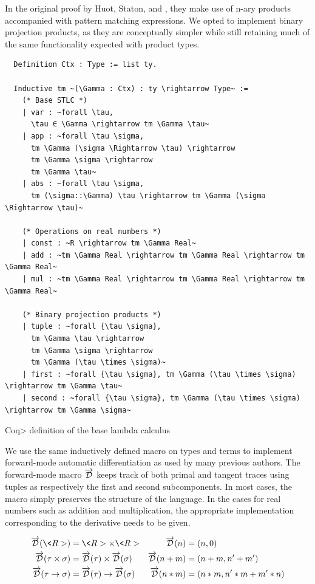\documentclass[11pt, final]{article}
\begin{document}
  In the original proof by Huot, Staton, and \Vakar{} \cite{huot2020correctness}, they make use of n-ary products accompanied with pattern matching expressions. We opted to implement binary projection products, as they are conceptually simpler while still retaining much of the same functionality expected with product types.

  \begin{listing}
    \begin{verbatim}
  Definition Ctx : Type := list ty.

  Inductive tm ~(\Gamma : Ctx) : ty \rightarrow Type~ :=
    (* Base STLC *)
    | var : ~forall \tau,
      \tau ∈ \Gamma \rightarrow tm \Gamma \tau~
    | app : ~forall \tau \sigma,
      tm \Gamma (\sigma \Rightarrow \tau) \rightarrow
      tm \Gamma \sigma \rightarrow
      tm \Gamma \tau~
    | abs : ~forall \tau \sigma,
      tm (\sigma::\Gamma) \tau \rightarrow tm \Gamma (\sigma \Rightarrow \tau)~

    (* Operations on real numbers *)
    | const : ~R \rightarrow tm \Gamma Real~
    | add : ~tm \Gamma Real \rightarrow tm \Gamma Real \rightarrow tm \Gamma Real~
    | mul : ~tm \Gamma Real \rightarrow tm \Gamma Real \rightarrow tm \Gamma Real~

    (* Binary projection products *)
    | tuple : ~forall {\tau \sigma},
      tm \Gamma \tau \rightarrow
      tm \Gamma \sigma \rightarrow
      tm \Gamma (\tau \times \sigma)~
    | first : ~forall {\tau \sigma}, tm \Gamma (\tau \times \sigma) \rightarrow tm \Gamma \tau~
    | second : ~forall {\tau \sigma}, tm \Gamma (\tau \times \sigma) \rightarrow tm \Gamma \sigma~
    \end{verbatim}
    \caption{\<Coq> definition of the base lambda calculus}
    \label{lst:stlc_base}
  \end{listing}

  We use the same inductively defined macro on types and terms to implement forward-mode automatic differentiation as used by many previous authors\cite{huot2020correctness}\cite{barthe2020versatility}\cite{Shaikha2019}.
  The forward-mode macro $\overrightarrow{\mathcal{D}}$ keeps track of both primal and tangent traces using tuples as respectively the first and second subcomponents.
  In most cases, the macro simply preserves the structure of the language.
  In the cases for real numbers such as addition and multiplication, the appropriate implementation corresponding to the derivative needs to be given.

  \begin{align*}
    \D(\<R>) &= \<R> \times \<R>
      & \D(n) &= (n, 0) \\
    \D(\tau \times \sigma) &= \D(\tau) \times \D(\sigma)
      & \D(n + m) &= (n + m, n' + m') \\
    \D(\tau \rightarrow \sigma) &= \D(\tau) \rightarrow \D(\sigma)
      & \D(n * m) &= (n * m, n' * m + m' * n)
    \label{eqn:macro_base}
  \end{align*}
\end{document}

